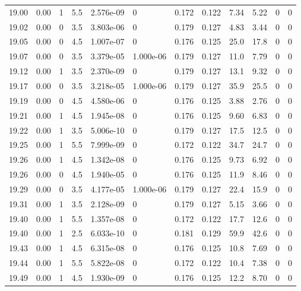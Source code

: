 \documentclass[preview]{standalone}
\begin{document}
{{{{{{{{{{{{{{{{{{\begin{tabular}{L{1.2cm}C{1.2cm} C{0.3cm}C{0.5cm} C{1.4cm}C{1.4cm} C{1.4cm}C{1.4cm} C{1.6cm}C{1.6cm} C{1.6cm}C{1.6cm}}
  19.00  &  0.00  & 1     & 5.5 &  2.576e-09  & 0  &  0.172&   0.122& 7.34 & 5.22   &  0 & 0  \\ 
  19.02  &  0.00  & 0     & 3.5 &  3.803e-06  & 0  &  0.179&   0.127& 4.83 & 3.44   &  0 & 0  \\ 
  19.05  &  0.00  & 0     & 4.5 &  1.007e-07  & 0  &  0.176&   0.125& 25.0 & 17.8   &  0 & 0  \\ 
  19.07  &  0.00  & 0     & 3.5 &  3.379e-05  & 1.000e-06  &  0.179&   0.127& 11.0 & 7.79   &  0 & 0  \\ 
  19.12  &  0.00  & 1     & 3.5 &  2.370e-09  & 0  &  0.179&   0.127& 13.1 & 9.32   &  0 & 0  \\ 
  19.17  &  0.00  & 0     & 3.5 &  3.218e-05  & 1.000e-06  &  0.179&   0.127& 35.9 & 25.5   &  0 & 0  \\ 
  19.19  &  0.00  & 0     & 4.5 &  4.580e-06  & 0  &  0.176&   0.125& 3.88 & 2.76   &  0 & 0  \\ 
  19.21  &  0.00  & 1     & 4.5 &  1.945e-08  & 0  &  0.176&   0.125& 9.60 & 6.83   &  0 & 0  \\ 
  19.22  &  0.00  & 1     & 3.5 &  5.006e-10  & 0  &  0.179&   0.127& 17.5 & 12.5   &  0 & 0  \\ 
  19.25  &  0.00  & 1     & 5.5 &  7.999e-09  & 0  &  0.172&   0.122& 34.7 & 24.7   &  0 & 0  \\ 
  19.26  &  0.00  & 1     & 4.5 &  1.342e-08  & 0  &  0.176&   0.125& 9.73 & 6.92   &  0 & 0  \\ 
  19.26  &  0.00  & 0     & 4.5 &  1.940e-05  & 0  &  0.176&   0.125& 11.9 & 8.46   &  0 & 0  \\ 
  19.29  &  0.00  & 0     & 3.5 &  4.177e-05  & 1.000e-06  &  0.179&   0.127& 22.4 & 15.9   &  0 & 0  \\ 
  19.31  &  0.00  & 1     & 3.5 &  2.128e-09  & 0  &  0.179&   0.127& 5.15 & 3.66   &  0 & 0  \\ 
  19.40  &  0.00  & 1     & 5.5 &  1.357e-08  & 0  &  0.172&   0.122& 17.7 & 12.6   &  0 & 0  \\ 
  19.40  &  0.00  & 1     & 2.5 &  6.033e-10  & 0  &  0.181&   0.129& 59.9 & 42.6   &  0 & 0  \\ 
  19.43  &  0.00  & 1     & 4.5 &  6.315e-08  & 0  &  0.176&   0.125& 10.8 & 7.69   &  0 & 0  \\ 
  19.44  &  0.00  & 1     & 5.5 &  5.822e-08  & 0  &  0.172&   0.122& 10.4 & 7.38   &  0 & 0  \\ 
  19.49  &  0.00  & 1     & 4.5 &  1.930e-09  & 0  &  0.176&   0.125& 12.2 & 8.70   &  0 & 0  \\ 

\end{tabular}}}}}}}}}}}}}}}}}}}
\end{document}
